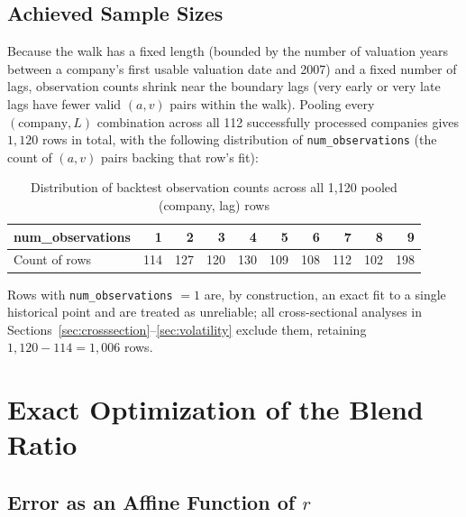 \documentclass[11pt]{article}
\begin{document}
\subsection{Achieved Sample Sizes}

Because the walk has a fixed length (bounded by the number of valuation years between a company's
first usable valuation date and 2007) and a fixed number of lags, observation counts shrink near
the boundary lags (very early or very late lags have fewer valid $(a,v)$ pairs within the walk).
Pooling every $(\text{company}, L)$ combination across all 112 successfully processed companies
gives $1{,}120$ rows in total, with the following distribution of \texttt{num\_observations} (the
count of $(a,v)$ pairs backing that row's fit):

\begin{table}[h]
\centering
\caption{Distribution of backtest observation counts across all 1{,}120 pooled (company, lag) rows}
\begin{tabular}{lrrrrrrrrr}
\toprule
num\_observations & 1 & 2 & 3 & 4 & 5 & 6 & 7 & 8 & 9 \\
\midrule
Count of rows & 114 & 127 & 120 & 130 & 109 & 108 & 112 & 102 & 198 \\
\bottomrule
\end{tabular}
\end{table}

Rows with \texttt{num\_observations} $=1$ are, by construction, an exact fit to a single historical
point and are treated as unreliable; all cross-sectional analyses in
Sections~\ref{sec:crosssection}--\ref{sec:volatility} exclude them, retaining $1{,}120-114=1{,}006$
rows.

\section{Exact Optimization of the Blend Ratio}
\label{sec:optimization}

\subsection{Error as an Affine Function of $r$}
\end{document}
